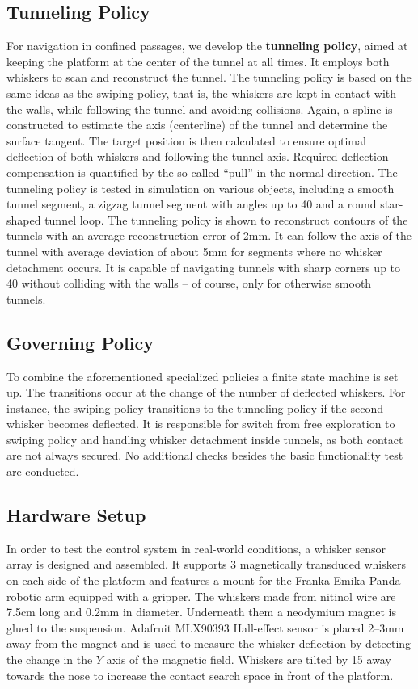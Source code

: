 \subsection{Tunneling Policy}
For navigation in confined passages, we develop the \textbf{tunneling policy}, aimed at keeping the platform at the center of the tunnel at all times.
It employs both whiskers to scan and reconstruct the tunnel.
The tunneling policy is based on the same ideas as the swiping policy, that is, the whiskers are kept in contact with the walls, while following the tunnel and avoiding collisions.
Again, a spline is constructed to estimate the axis (centerline) of the tunnel and determine the surface tangent.
The target position is then calculated to ensure optimal deflection of both whiskers and following the tunnel axis.
Required deflection compensation is quantified by the so-called \enquote{pull} in the normal direction.
The tunneling policy is tested in simulation on various objects, including a smooth tunnel segment, a zigzag tunnel segment with angles up to 40\degree{} and a round star-shaped tunnel loop.
The tunneling policy is shown to reconstruct contours of the tunnels with an average reconstruction error of 2mm.
It can follow the axis of the tunnel with average deviation of about 5mm for segments where no whisker detachment occurs.
It is capable of navigating tunnels with sharp corners up to 40\degree{} without colliding with the walls -- of course, only for otherwise smooth tunnels.

\subsection{Governing Policy}
To combine the aforementioned specialized policies a finite state machine is set up.
The transitions occur at the change of the number of deflected whiskers.
For instance, the swiping policy transitions to the tunneling policy if the second whisker becomes deflected.
It is responsible for switch from free exploration to swiping policy and handling whisker detachment inside tunnels, as both contact are not always secured.
No additional checks besides the basic functionality test are conducted.

\subsection{Hardware Setup}
In order to test the control system in real-world conditions, a whisker sensor array is designed and assembled.
It supports 3 magnetically transduced whiskers on each side of the platform and features a mount for the Franka Emika Panda robotic arm equipped with a gripper.
The whiskers made from nitinol wire are 7.5cm long and 0.2mm in diameter.
Underneath them a neodymium magnet is glued to the suspension.
Adafruit MLX90393 Hall-effect sensor is placed 2--3mm away from the magnet and is used to measure the whisker deflection by detecting the change in the $Y$ axis of the magnetic field.
Whiskers are tilted by 15\degree{} away towards the nose to increase the contact search space in front of the platform.

